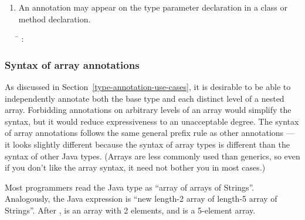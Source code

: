 \documentclass[10pt]{article}
\begin{document}
\begin{enumerate}
\begin{tabbing}
\qquad \= \kill
{}: \\
\qquad        \term{(}  \term{)} \\
\\
: \\
\qquad        {}    \\
\qquad        {}
\end{tabbing}


\item
An annotation may appear on the type parameter
declaration in a class or method declaration.

\begin{tabbing}
\qquad \= \kill
{}: \\
\qquad            {}  
\end{tabbing}

\end{enumerate}




\subsubsection{Syntax of array annotations\label{array-syntax}}

As discussed in Section~\ref{type-annotation-use-cases}, it is
desirable to be able to independently annotate both the base type and
each distinct level of a nested array.
Forbidding annotations on arbitrary levels of an array would simplify the
syntax, but it would reduce expressiveness to an unacceptable degree.
The syntax of array annotations follows the same general prefix rule as
other annotations --- it looks slightly different because the syntax
of array types is different than the syntax of other Java types.
(Arrays are less commonly used than generics, so even if you don't like the
array syntax, it need not bother you in most cases.)

Most programmers read the Java type  as
``array of arrays of Strings''.  Analogously, the Java expression
 is ``new length-2 array of length-5 array of Strings''.
After ,  is an array with
2 elements, and  is a 5-element array.
\end{document}
